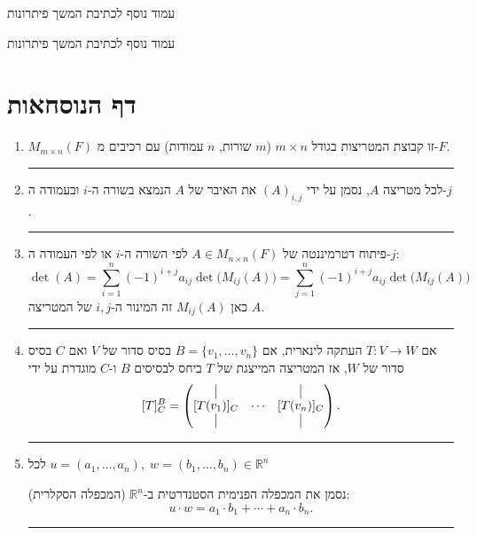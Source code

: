 \documentclass[12pt, a4paper]{article}
\begin{document}
    \pagebreak 
    
    עמוד נוסף לכתיבת המשך פיתרונות
    
    \pagebreak
    עמוד נוסף לכתיבת המשך פיתרונות

 \pagebreak


\section*{דף הנוסחאות}

\begin{enumerate}
\item $M_{m\times n}(F)$ זו קבוצת המטריצות בגודל $m\times n$
($m$ שורות, $n$ עמודות)
עם רכיבים מ-$F$.

\noindent\rule{\textwidth-30pt}{0.4pt}

\item לכל מטריצה $A$, נסמן על ידי $(A)_{i,j}$ את האיבר של $A$ הנמצא בשורה ה-$i$ ובעמודה ה-$j$.

\noindent\rule{\textwidth-30pt}{0.4pt}

\item פיתוח דטרמיננטה של $A\in M_{n\times n}(F)$ לפי השורה ה-$i$ או לפי העמודה ה-$j$:
\[
\det(A)=\sum_{i=1}^{n}(-1)^{i+j}a_{ij}\det\!\big(M_{ij}(A)\big)
=\sum_{j=1}^{n}(-1)^{i+j}a_{ij}\det\!\big(M_{ij}(A)\big)
\]
כאן $M_{ij}(A)$ זה המינור ה-$i,j$ של המטריצה $A$.

\noindent\rule{\textwidth-30pt}{0.4pt}

\item אם $T:V\to W$ העתקה לינארית, אם $B=\{v_1,\ldots,v_n\}$ בסיס סדור של $V$ ואם $C$ בסיס סדור של $W$,
אז המטריצה המייצגת של $T$ ביחס לבסיסים $B$ ו-$C$ מוגדרת על ידי
\[
[T]^B_C=
\begin{pmatrix}
\vline & & \vline\\
[T(v_1)]_C & \cdots & [T(v_n)]_C\\
\vline & & \vline
\end{pmatrix}.
\]

\noindent\rule{\textwidth-30pt}{0.4pt}

\item לכל $u=(a_1,\ldots,a_n),\; w=(b_1,\ldots,b_n)\in\mathbb{R}^n$

נסמן את המכפלה הפנימית הסטנדרטית ב-$\mathbb{R}^n$ (המכפלה הסקלרית):
\[
 u\cdot w=a_1\cdot b_1+\cdots+a_n\cdot b_n.
\]

\noindent\rule{\textwidth-30pt}{0.4pt}




\end{enumerate}
\end{document}

